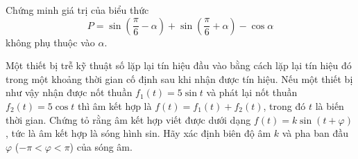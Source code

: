 \begin{vd}[VDT]%
	Chứng minh giá trị của biểu thức
	$$P = \sin \left(\dfrac{\pi}{6}-\alpha\right) + \sin \left(\dfrac{\pi}{6} + \alpha\right) -\cos \alpha$$
	không phụ thuộc vào $\alpha$.
\end{vd}

\begin{vd}[VDC]%
	Một thiết bị trễ kỹ thuật số lặp lại tín hiệu đầu vào bằng cách lặp lại tín hiệu đó trong một khoảng thời gian cố định sau khi nhận được tín hiệu. Nếu một thiết bị như vậy nhận được nốt thuần $f_1(t) = 5\sin t$ và phát lại nốt thuần $f_2(t) = 5\cos t$ thì âm kết hợp là $f(t)=f_1(t)+f_2(t)$, trong đó $t$ là biến thời gian. Chứng tỏ rằng âm kết hợp viết được dưới dạng $f(t) = k\sin(t+\varphi)$, tức là âm kết hợp là sóng hình sin. Hãy xác định biên độ âm $k$ và pha ban đầu $\varphi$ ($-\pi < \varphi <\pi$) của sóng âm.
\end{vd}

